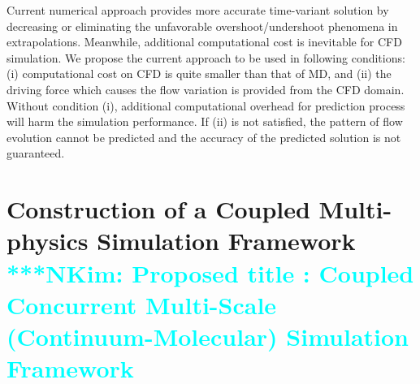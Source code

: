 \documentclass[preprint,12pt]{elsarticle}
\newcommand{\Nkimnote}[1]{ {\textcolor{cyan} { ***NKim: #1 }}}
\newcommand{\Nkimnote}[1]{}
\begin{document}


Current numerical approach provides more accurate time-variant solution by decreasing or eliminating the unfavorable overshoot/undershoot phenomena in extrapolations. Meanwhile, additional computational cost is inevitable for CFD simulation. We propose the current approach to be used in following conditions: (i) computational cost on CFD is quite smaller than that of MD, and (ii) the driving force which causes the flow variation is provided from the CFD domain. Without condition (i), additional computational overhead for prediction process will harm the simulation performance. If (ii) is not satisfied, the pattern of flow evolution cannot be predicted and the accuracy of the predicted solution is not guaranteed.



\section{Construction of a Coupled Multi-physics Simulation Framework
\\
\Nkimnote{Proposed title : Coupled Concurrent Multi-Scale (Continuum-Molecular) Simulation Framework}}
\label{sec:computational}
\end{document}
